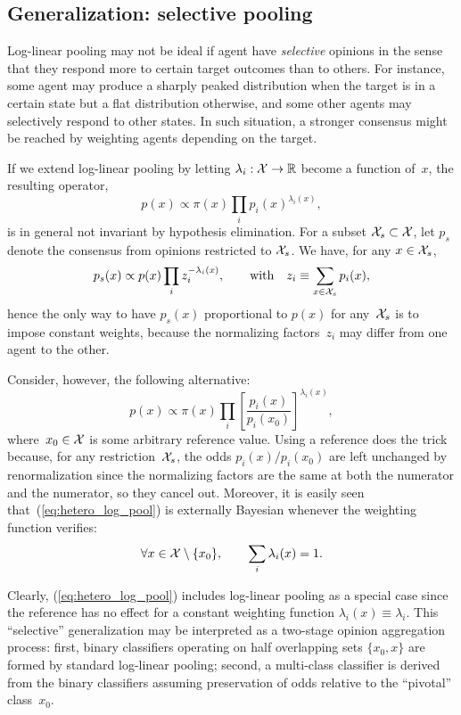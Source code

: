 \documentclass[english]{scrartcl}
\begin{document}
\subsection{Generalization: selective pooling}
\label{app:log_pool_selective}

Log-linear pooling may not be ideal if agent have {\em selective} opinions in the sense that they respond more to certain target outcomes than to others. For instance, some agent may produce a sharply peaked distribution when the target is in a certain state but a flat distribution otherwise, and some other agents may selectively respond to other states. In such situation, a stronger consensus might be reached by weighting agents depending on the target. 

If we extend log-linear pooling by letting $\lambda_i : {\cal X}\to\mathbb{R}$ become a function of~$x$, the resulting operator,
$$
p(x)\propto \pi(x) \prod_i p_i(x)^{\lambda_i(x)},
$$
is in general not invariant by hypothesis elimination. For a subset ${\cal X}_s\subset {\cal X}$, let $p_s$ denote the consensus from opinions restricted to ${\cal X}_s$. We have, for any $x\in{\cal X}_s$,
$$
p_s(x)
\propto
p(x)
\prod_i z_i^{-\lambda_i(x)},
\qquad \text{with} \quad
z_i \equiv \sum_{x\in{\cal X}_s} p_i(x),
$$
hence the only way to have $p_s(x)$ proportional to $p(x)$ for any~${\cal X}_s$ is to impose constant weights, because the normalizing factors~$z_i$ may differ from one agent to the other.

Consider, however, the following alternative:
\begin{equation}
\label{eq:hetero_log_pool}
p(x) \propto \pi(x) \prod_i \left[\frac{p_i(x)}{p_i(x_0)}\right]^{\lambda_i(x)},    
\end{equation}
where~$x_0\in{\cal X}$ is some arbitrary reference value. Using a reference does the trick because, for any restriction~${\cal X}_s$, the odds $p_i(x)/p_i(x_0)$ are left unchanged by renormalization since the normalizing factors are the same at both the numerator and the numerator, so they cancel out. Moreover, it is easily seen that~(\ref{eq:hetero_log_pool}) is externally Bayesian whenever the weighting function verifies:
$$
\forall x \in {\cal X}\setminus \{x_0\},
\qquad
\sum_i \lambda_i(x) = 1.
$$

Clearly, (\ref{eq:hetero_log_pool}) includes log-linear pooling as a special case since the reference has no effect for a constant weighting function $\lambda_i(x)\equiv \lambda_i$. This ``selective'' generalization may be interpreted as a two-stage opinion aggregation process: first, binary classifiers operating on half overlapping sets $\{x_0,x\}$ are formed by standard log-linear pooling; second, a multi-class classifier is derived from the binary classifiers assuming preservation of odds relative to the ``pivotal'' class~$x_0$.
\end{document}
